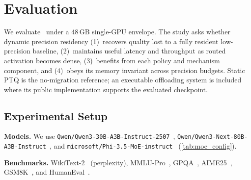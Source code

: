 \section{Evaluation}

We evaluate \systemname\ under a 48\,GB single-GPU envelope. The study asks whether dynamic precision residency (1)~recovers quality lost to a fully resident low-precision baseline, (2)~maintains useful latency and throughput as routed activation becomes dense, (3)~benefits from each policy and mechanism component, and (4)~obeys its memory invariant across precision budgets. Static PTQ is the no-migration reference; an executable offloading system is included where its public implementation supports the evaluated checkpoint.

\subsection{Experimental Setup}
\label{sec:eval-setup}

\begin{table}[t]
  \centering
  \caption{Configuration of evaluated MoE models.}
  \label{tab:moe_config}
  \vspace{-0.5em}
  \setlength{\tabcolsep}{4pt}
\end{table}

\noindent\textbf{Models.}
We use \nolinkurl{Qwen/Qwen3-30B-A3B-Instruct-2507}~\cite{qwen3technicalreport}, \nolinkurl{Qwen/Qwen3-Next-80B-A3B-Instruct}~\cite{qwen3nextmodelcard}, and \nolinkurl{microsoft/Phi-3.5-MoE-instruct}~\cite{abdin2024phi3} (\autoref{tab:moe_config}).

\noindent\textbf{Benchmarks.}
WikiText-2~\cite{merity2016pointer} (perplexity), MMLU-Pro~\cite{wang2024mmlu}, GPQA~\cite{rein2024gpqa}, AIME25~\cite{zhang2025aime25}, GSM8K~\cite{cobbe2021gsm8k}, and HumanEval~\cite{chen2021evaluating}.

